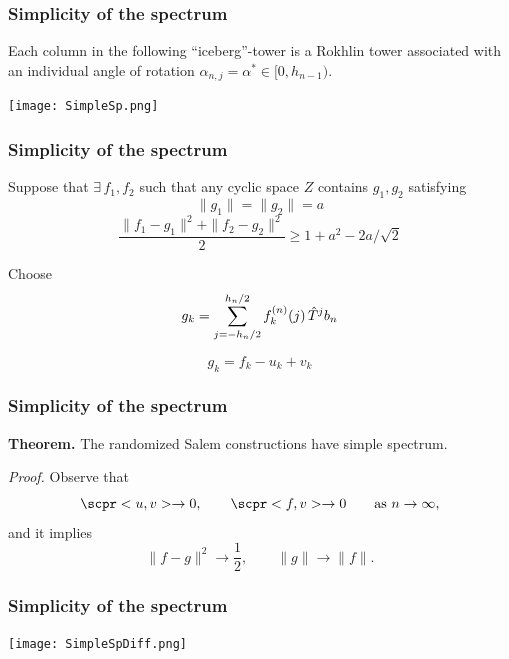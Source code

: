 \begin{frame}
  \frametitle{Simplicity of the spectrum}

  {\small Each column in the following ``iceberg''-tower is a Rokhlin tower associated with 
  an individual angle of rotation $\alpha_{n,j} = \alpha^* \in [0,h_{n-1})$.} 

  \begin{center}
  \addvspace{-12pt}  
  \texttt{[image: SimpleSp.png]}
  \end{center}
       
    
\end{frame}



\begin{frame}
  \frametitle{Simplicity of the spectrum}

  Suppose that $\exists\, f_1,f_2$ such that any cyclic space $Z$ contains $g_1,g_2$ 
  satisfying 
  $$
    \|g_1\| = \|g_2\| = a
  $$
  $$
    \frac{\|f_1-g_1\|^2 + \|f_2-g_2\|^2}2 \ge 1+a^2-2a/\sqrt{2} 
  $$
  
  Choose 
  $$
    g_k = \sum_{j=-h_n/2}^{h_n/2} f^{(n)}_k(j) \,{\Hat T}^j b_n
  $$
  
  \medskip
  $$
    g_k = f_k - u_k + v_k
  $$
  
    
\end{frame}



\begin{frame}
  \frametitle{Simplicity of the spectrum}

  {\bf Theorem.} The randomized Salem constructions have simple spectrum.
  
  \bigskip
  {\it Proof.\/} Observe that 
  $$
    \scpr<u,v> \to 0, \qquad \scpr<f,v> \to 0 \qquad \text{as $n \to \infty$}, 
  $$
  and it implies  
  $$
    \|f-g\|^2 \to \frac12, \qquad \|g\| \to \|f\|. 
  $$
    
\end{frame}



\begin{frame}
  \frametitle{Simplicity of the spectrum}

  \begin{center}
  \texttt{[image: SimpleSpDiff.png]}
  \end{center}
       
    
\end{frame}



